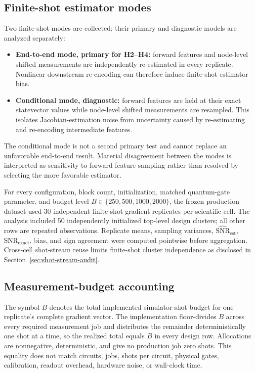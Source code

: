 \documentclass[pdflatex,sn-mathphys-num,Numbered]{sn-jnl}
\newcommand{\snrest}{\widehat{\mathrm{SNR}}_{\mathrm{est}}}
\newcommand{\snrexact}{\mathrm{SNR}_{\mathrm{exact}}}
\begin{document}
\subsection{Finite-shot estimator modes}

Two finite-shot modes are collected; their primary and diagnostic models are analyzed separately:

\begin{itemize}
\item \textbf{End-to-end mode, primary for H2--H4:} forward features and node-level shifted measurements are independently re-estimated in every replicate. Nonlinear downstream re-encoding can therefore induce finite-shot estimator bias.
\item \textbf{Conditional mode, diagnostic:} forward features are held at their exact statevector values while node-level shifted measurements are resampled. This isolates Jacobian-estimation noise from uncertainty caused by re-estimating and re-encoding intermediate features.
\end{itemize}

The conditional mode is not a second primary test and cannot replace an unfavorable end-to-end result. Material disagreement between the modes is interpreted as sensitivity to forward-feature sampling rather than resolved by selecting the more favorable estimator.

For every configuration, block count, initialization, matched quantum-gate parameter, and budget level $B\in\{250,500,1000,2000\}$, the frozen production dataset used 30 independent finite-shot gradient replicates per scientific cell. The analysis included 50 independently initialized top-level design clusters; all other rows are repeated observations. Replicate means, sampling variances, $\snrest$, $\snrexact$, bias, and sign agreement were computed pointwise before aggregation. Cross-cell shot-stream reuse limits finite-shot cluster independence as disclosed in Section~\ref{sec:shot-stream-audit}.

\subsection{Measurement-budget accounting}
\label{sec:budget}

The symbol $B$ denotes the total implemented simulator-shot budget for one replicate's complete gradient vector. The implementation floor-divides $B$ across every required measurement job and distributes the remainder deterministically one shot at a time, so the realized total equals $B$ in every design row. Allocations are nonnegative, deterministic, and give no production job zero shots. This equality does not match circuits, jobs, shots per circuit, physical gates, calibration, readout overhead, hardware noise, or wall-clock time.
\end{document}
